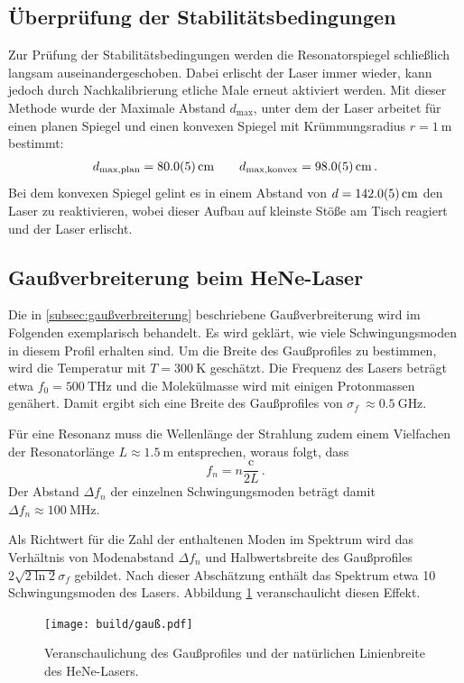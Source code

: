 \subsection{Überprüfung der Stabilitätsbedingungen}
\label{subsec:stabilitätsbedingungen}
Zur Prüfung der Stabilitätsbedingungen werden die Resonatorspiegel schließlich
langsam auseinandergeschoben.
Dabei erlischt der Laser immer wieder, kann jedoch durch Nachkalibrierung
etliche Male erneut aktiviert werden.
Mit dieser Methode wurde der Maximale Abstand $d_\text{max}$,
unter dem der Laser arbeitet
für einen planen Spiegel und einen konvexen Spiegel mit Krümmungsradius
$r = \SI{1}{\meter}$ bestimmt:
\begin{align*}
    d_\text{max,plan} = \SI{80\pm0.5}{\centi\meter} \qquad
    d_\text{max,konvex} = \SI{98\pm0.5}{\centi\meter}\,.
\end{align*}
Bei dem konvexen Spiegel gelint es in einem Abstand von
$d=\SI{142\pm0.5}{\centi\meter}$ den Laser zu reaktivieren, wobei dieser Aufbau
auf kleinste Stöße am Tisch reagiert und der Laser erlischt.

\subsection{Gaußverbreiterung beim HeNe-Laser}
\label{subsec:gauß_diskussion}
Die in \ref{subsec:gaußverbreiterung} beschriebene Gaußverbreiterung wird im
Folgenden exemplarisch behandelt.
Es wird geklärt, wie viele Schwingungsmoden in diesem Profil erhalten sind.
Um die Breite des Gaußprofiles zu bestimmen, wird die Temperatur mit 
$T = \SI{300}{\kelvin}$ geschätzt. Die Frequenz des Lasers beträgt etwa
$f_0 = \SI{500}{\tera\hertz}$ und die Molekülmasse wird mit einigen
Protonmassen genähert.
Damit ergibt sich eine Breite des Gaußprofiles von $\sigma_f \
\approx \SI{0.5}{\giga\hertz}$.

Für eine Resonanz muss die Wellenlänge der Strahlung zudem einem Vielfachen
der Resonatorlänge $L\approx \SI{1.5}{\meter}$ entsprechen, woraus folgt, dass
\begin{equation*}
    f_n = n \frac{\mathrm{c}}{2L}\,.
\end{equation*}
Der Abstand $\Delta f_n$ der einzelnen Schwingungsmoden beträgt damit 
$\Delta f_n \approx \SI{100}{\mega\hertz}$.

Als Richtwert für die Zahl der enthaltenen Moden im Spektrum wird das
Verhältnis von Modenabstand $\Delta f_n$ und Halbwertsbreite des Gaußprofiles
$2\sqrt{2\ln2} \sigma_f$ gebildet.
Nach dieser Abschätzung enthält das Spektrum etwa \num{10} Schwingungsmoden
des Lasers.
Abbildung \ref{fig:gauß} veranschaulicht diesen Effekt.
\begin{figure}
    \centering
    \texttt{[image: build/gauß.pdf]}
    \caption{
        Veranschaulichung des Gaußprofiles und der natürlichen Linienbreite
        des HeNe-Lasers.
    }
    \label{fig:gauß}
\end{figure}
